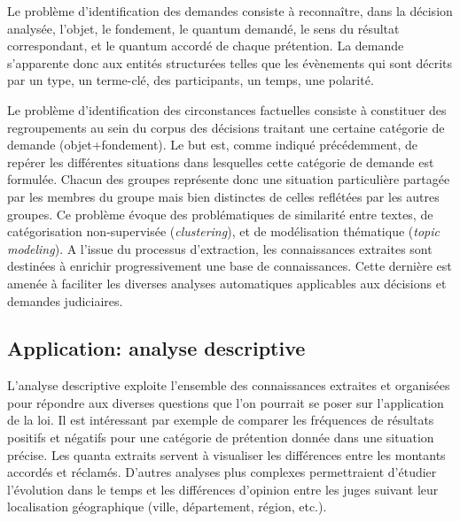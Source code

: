 Le problème d'identification des demandes consiste à reconnaître, dans la décision analysée, l'objet, le fondement, le quantum demandé, le sens du résultat correspondant, et le quantum accordé de chaque prétention. La demande s'apparente donc aux entités structurées telles que les évènements \cite{ace2005event} qui sont décrits par un type, un terme-clé, des participants, un temps, une polarité.

Le problème d'identification des circonstances factuelles consiste à constituer des regroupements au sein du corpus des décisions traitant une certaine catégorie de demande (objet+fondement). Le but est, comme indiqué précédemment, de repérer les différentes situations dans lesquelles cette catégorie de demande est formulée. Chacun des groupes représente donc une situation particulière partagée par les membres du groupe mais bien distinctes de celles reflétées par les autres groupes. Ce problème évoque des problématiques de similarité entre textes, de catégorisation non-supervisée (\textit{clustering}), et de \og modélisation thématique \fg{} (\textit{topic modeling}). 
A l'issue du processus d'extraction, les connaissances extraites sont destinées à enrichir progressivement une base de connaissances. Cette dernière est amenée à  faciliter les diverses analyses automatiques applicables aux décisions et demandes judiciaires. 

\subsection{Application: analyse descriptive}
L'analyse descriptive exploite l'ensemble des connaissances extraites et organisées pour répondre aux diverses questions que l'on pourrait se poser sur l'application de la loi. Il est intéressant par exemple de comparer les fréquences de résultats positifs et négatifs pour une catégorie de prétention donnée dans une situation précise. Les quanta extraits servent à visualiser les différences entre les montants accordés et réclamés. D'autres analyses plus complexes permettraient d'étudier l'évolution dans le temps et les différences d'opinion entre les juges suivant leur localisation géographique (ville, département, région, etc.).


